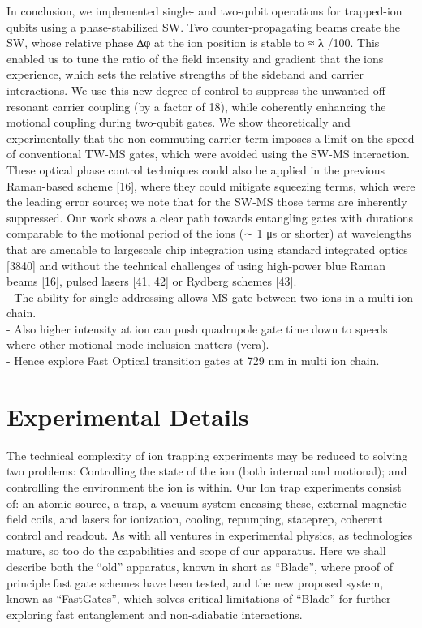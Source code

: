 \documentclass[12pt]{iopart}
\begin{document}
    In conclusion, we implemented single- and two-qubit operations for
    trapped-ion qubits using a phase-stabilized SW. Two
    counter-propagating beams create the SW, whose relative phase ∆φ at
    the ion position is stable to ≈ λ /100. This enabled us to tune the
    ratio of the field intensity and gradient that the ions experience,
    which sets the relative strengths of the sideband and carrier
    interactions. We use this new degree of control to suppress the
    unwanted off-resonant carrier coupling (by a factor of 18), while
    coherently enhancing the motional coupling during two-qubit gates. We
    show theoretically and experimentally that the non-commuting carrier
    term imposes a limit on the speed of conventional TW-MS gates, which
    were avoided using the SW-MS interaction. These optical phase control
    techniques could also be applied in the previous Raman-based scheme
    [16], where they could mitigate squeezing terms, which were the
    leading error source; we note that for the SW-MS those terms are
    inherently suppressed. Our work shows a clear path towards entangling
    gates with durations comparable to the motional period of the ions (∼
    1 μs or shorter) at wavelengths that are amenable to largescale chip
    integration using standard integrated optics [3840] and without the
    technical challenges of using high-power blue Raman beams [16], pulsed
    lasers [41, 42] or Rydberg schemes [43].\\

    - The ability for single addressing allows MS gate between two ions in a multi ion chain.\\
    - Also higher intensity at ion can push quadrupole gate time down to speeds where other motional mode inclusion matters (vera).\\
    - Hence explore Fast Optical transition gates at 729 nm in multi ion chain.\\
    

\section{Experimental Details}

The technical complexity of ion trapping experiments may be reduced to
solving two problems: Controlling the state of the ion (both internal
and motional); and controlling the environment the ion is within.
Our Ion trap experiments consist of: an atomic source, a trap, a
vacuum system encasing these, external magnetic field coils, and
lasers for ionization, cooling, repumping, stateprep, coherent
control and readout.
As with all ventures in experimental physics, as technologies mature, so
too do the capabilities and scope of our apparatus.  Here we shall
describe both the ``old'' apparatus, known in short as ``Blade'', where
proof of principle fast gate schemes have been tested, and the new
proposed system, known as ``FastGates'', which solves critical
limitations of ``Blade'' for further exploring fast entanglement and
non-adiabatic interactions.
\end{document}
